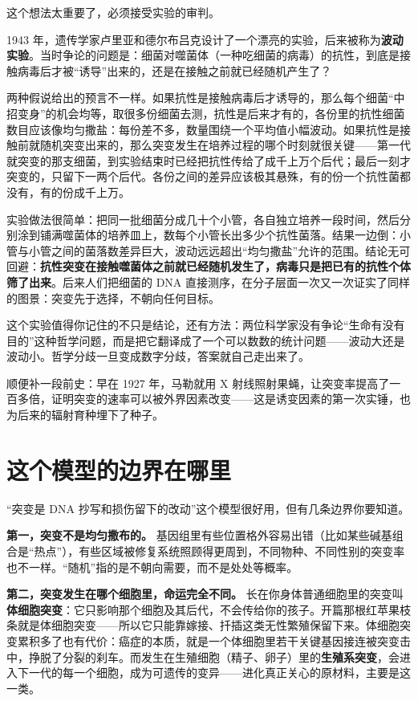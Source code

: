 这个想法太重要了，必须接受实验的审判。

\begin{zhengju}
1943 年，遗传学家卢里亚和德尔布吕克设计了一个漂亮的实验，后来被称为\textbf{波动实验}。当时争论的问题是：细菌对噬菌体（一种吃细菌的病毒）的抗性，到底是接触病毒后才被“诱导”出来的，还是在接触之前就已经随机产生了？

两种假说给出的预言不一样。如果抗性是接触病毒后才诱导的，那么每个细菌“中招变身”的机会均等，取很多份细菌去测，抗性是后来才有的，各份里的抗性细菌数目应该像均匀撒盐：每份差不多，数量围绕一个平均值小幅波动。如果抗性是接触前就随机突变出来的，那么突变发生在培养过程的哪个时刻就很关键——第一代就突变的那支细菌，到实验结束时已经把抗性传给了成千上万个后代；最后一刻才突变的，只留下一两个后代。各份之间的差异应该极其悬殊，有的份一个抗性菌都没有，有的份成千上万。

实验做法很简单：把同一批细菌分成几十个小管，各自独立培养一段时间，然后分别涂到铺满噬菌体的培养皿上，数每个小管长出多少个抗性菌落。结果一边倒：小管与小管之间的菌落数差异巨大，波动远远超出“均匀撒盐”允许的范围。结论无可回避：\textbf{抗性突变在接触噬菌体之前就已经随机发生了，病毒只是把已有的抗性个体筛了出来}。后来人们把细菌的 DNA 直接测序，在分子层面一次又一次证实了同样的图景：突变先于选择，不朝向任何目标。

这个实验值得你记住的不只是结论，还有方法：两位科学家没有争论“生命有没有目的”这种哲学问题，而是把它翻译成了一个可以数数的统计问题——波动大还是波动小。哲学分歧一旦变成数字分歧，答案就自己走出来了。

顺便补一段前史：早在 1927 年，马勒就用 X 射线照射果蝇，让突变率提高了一百多倍，证明突变的速率可以被外界因素改变——这是诱变因素的第一次实锤，也为后来的辐射育种埋下了种子。
\end{zhengju}

\section{这个模型的边界在哪里}

“突变是 DNA 抄写和损伤留下的改动”这个模型很好用，但有几条边界你要知道。

\textbf{第一，突变不是均匀撒布的。} 基因组里有些位置格外容易出错（比如某些碱基组合是“热点”），有些区域被修复系统照顾得更周到，不同物种、不同性别的突变率也不一样。“随机”指的是不朝向需要，而不是处处等概率。

\textbf{第二，突变发生在哪个细胞里，命运完全不同。} 长在你身体普通细胞里的突变叫\textbf{体细胞突变}：它只影响那个细胞及其后代，不会传给你的孩子。开篇那根红苹果枝条就是体细胞突变——所以它只能靠嫁接、扦插这类无性繁殖保留下来。体细胞突变累积多了也有代价：癌症的本质，就是一个体细胞里若干关键基因接连被突变击中，挣脱了分裂的刹车。而发生在生殖细胞（精子、卵子）里的\textbf{生殖系突变}，会进入下一代的每一个细胞，成为可遗传的变异——进化真正关心的原材料，主要是这一类。

